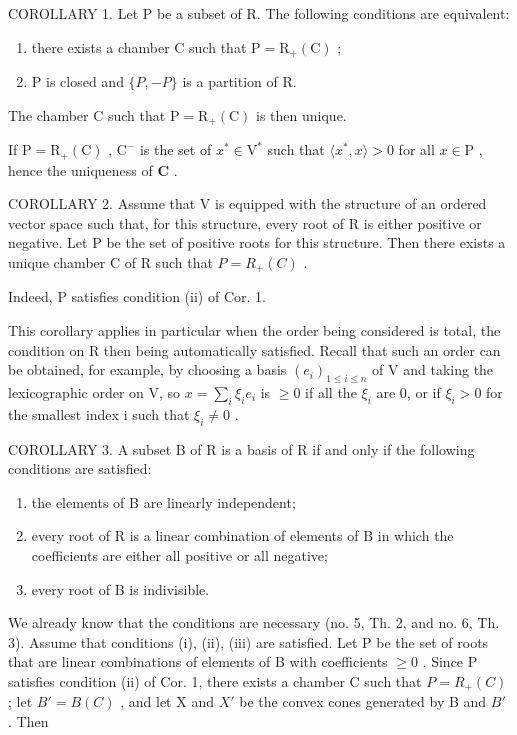 COROLLARY 1. Let P be a subset of R. The following conditions are equivalent:

\begin{enumerate}
\def\labelenumi{(\roman{enumi})}
\item
  there exists a chamber C such that \(\mathrm{P} = \mathrm{R}_{+}(\mathrm{C})\) ;
\item
  P is closed and \(\{P, -P\}\) is a partition of R.
\end{enumerate}

The chamber C such that \(\mathrm{P} = \mathrm{R}_{+}(\mathrm{C})\) is then unique.

If \(\mathrm{P} = \mathrm{R}_{+}(\mathrm{C})\) , \(\mathrm{C}^{-}\) is the set of \(x^{*} \in \mathrm{V}^{*}\) such that \(\langle x^{*}, x \rangle > 0\) for all \(x \in \mathrm{P}\) , hence the uniqueness of \(\mathbf{C}\) .

COROLLARY 2. Assume that V is equipped with the structure of an ordered vector space such that, for this structure, every root of R is either positive or negative. Let P be the set of positive roots for this structure. Then there exists a unique chamber C of R such that \(P = R_{+}(C)\) .

Indeed, P satisfies condition (ii) of Cor. 1.

This corollary applies in particular when the order being considered is total, the condition on R then being automatically satisfied. Recall that such an order can be obtained, for example, by choosing a basis \((e_{i})_{1\leqslant i\leqslant n}\) of V and taking the lexicographic order on V, so \(x=\sum_{i}\xi_{i}e_{i}\) is \(\geqslant0\) if all the \(\xi_{i}\) are 0, or if \(\xi_{i}>0\) for the smallest index i such that \(\xi_{i}\neq0\) .

COROLLARY 3. A subset B of R is a basis of R if and only if the following conditions are satisfied:

\begin{enumerate}
\def\labelenumi{(\roman{enumi})}
\item
  the elements of B are linearly independent;
\item
  every root of R is a linear combination of elements of B in which the coefficients are either all positive or all negative;
\item
  every root of B is indivisible.
\end{enumerate}

We already know that the conditions are necessary (no. 5, Th. 2, and no. 6, Th. 3). Assume that conditions (i), (ii), (iii) are satisfied. Let P be the set of roots that are linear combinations of elements of B with coefficients \(\geqslant0\) . Since P satisfies condition (ii) of Cor. 1, there exists a chamber C such that \(P = R_{+}(C)\) ; let \(B' = B(C)\) , and let X and \(X'\) be the convex cones generated by B and \(B'\) . Then


